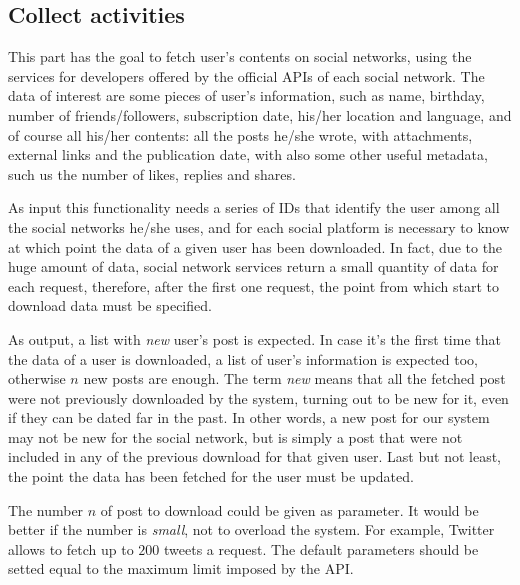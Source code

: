 \subsection{Collect activities}
This part has the goal to fetch user's contents on social networks, using the services for developers offered by the official APIs of each social network. The data of interest are some pieces of user's information, such as name, birthday, number of friends/followers, subscription date, his/her location and language, and of course all his/her contents: all the posts he/she wrote, with attachments, external links and the publication date, with also some other useful metadata, such us the number of likes, replies and shares.

As input this functionality needs a series of IDs that identify the user among all the social networks he/she uses, and for each social platform is necessary to know at which point the data of a given user has been downloaded. In fact, due to the huge amount of data, social network services return a small quantity of data for each request, therefore, after the first one request, the point from which start to download data must be specified.

As output, a list with \textit{new} user's post is expected. In case it's the first time that the data of a user is downloaded, a list of user's information is expected too, otherwise $ n $ new posts are enough. The term \textit{new} means that all the fetched post were not previously downloaded by the system, turning out to be new for it, even if they can be dated far in the past. In other words, a new post for our system may not be new for the social network, but is simply a post that were not included in any of the previous download for that given user. Last but not least, the point the data has been fetched for the user must be updated.

The number $ n $ of post to download could be given as parameter. It would be better if the number is \textit{small}, not to overload the system. For example, Twitter allows to fetch up to $ 200 $ tweets a request. The default parameters should be setted equal to the maximum limit imposed by the API.

